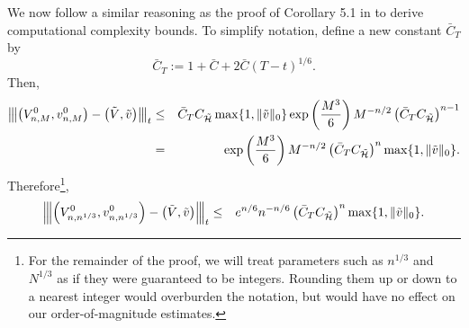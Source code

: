 \documentclass[11pt]{article}
\theoremstyle{definition}
\theoremstyle{plain}
\newcommand{\cH}{{\cal H}}
\newcommand{\vertiii}[1]{{\left\vert\kern-0.25ex\left\vert\kern-0.25ex\left\vert #1 
    \right\vert\kern-0.25ex\right\vert\kern-0.25ex\right\vert}}
\begin{document}
\begin{appendices}
  We now follow a similar reasoning as the proof of Corollary 5.1 in \cite{HJK2022} to derive computational complexity bounds.
  To simplify notation, define a new constant $\bar C_T$ by
  \[
  \bar C_T := 1 + \bar C + 2\bar C (T-t)^{1/6}. 
  \]
  Then, 
  \begin{eqnarray*}
  \vertiii{\left(V_{n,M}^{0}, v_{n,M}^{0}\right) - \left(\tilde V, \tilde{v}\right)}_{t} 
  &\leq & \bar C_T C_{\tilde \cH} \max\{1, \|\tilde v\|_0\} \exp\left(\frac{M^3}{6}\right) M^{-n/2} \left(\bar C_T C_{\tilde \cH} \right)^{n-1} \\
  &=& \exp\left(\frac{M^3}{6}\right) M^{-n/2} \left(\bar C_T C_{\tilde \cH} \right)^n \max\{1, \|\tilde v\|_0\}.
  \end{eqnarray*}
  Therefore\footnote{For the remainder of the proof, we will treat parameters such as $n^{1/3}$ and $N^{1/3}$ as if they were guaranteed to be integers. 
  Rounding them up or down to a nearest integer would overburden the notation, but would have no effect on our order-of-magnitude estimates.}, 
  \begin{eqnarray*}
  \vertiii{\left(V_{n,n^{1/3}}^{0}, v_{n,n^{1/3}}^{0}\right) - \left(\tilde V, \tilde{v}\right)}_{t} 
  &\leq & e^{n/6} n^{-n/6} \left(\bar C_T C_{\tilde \cH} \right)^n \max\{1, \|\tilde v\|_0\}.
  \end{eqnarray*}
  

\end{appendices}
\end{document}
